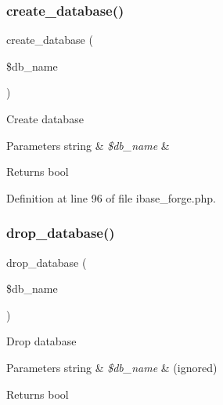 \mbox{\label{class_c_i___d_b__ibase__forge_a902a7267babceb2ce595706f217e00ad}} 
\subsubsection{\texorpdfstring{create\_database()}{create\_database()}}
{\footnotesize\ttfamily create\+\_\+database (\begin{DoxyParamCaption}\item[{}]{\$db\+\_\+name }\end{DoxyParamCaption})}

Create database


\begin{DoxyParams}[1]{Parameters}
string & {\em \$db\+\_\+name} & \\
\hline
\end{DoxyParams}
\begin{DoxyReturn}{Returns}
bool 
\end{DoxyReturn}


Definition at line 96 of file ibase\+\_\+forge.\+php.

\mbox{\label{class_c_i___d_b__ibase__forge_a9612987b2d4230de2638d15857e92e67}} 
\subsubsection{\texorpdfstring{drop\_database()}{drop\_database()}}
{\footnotesize\ttfamily drop\+\_\+database (\begin{DoxyParamCaption}\item[{}]{\$db\+\_\+name }\end{DoxyParamCaption})}

Drop database


\begin{DoxyParams}[1]{Parameters}
string & {\em \$db\+\_\+name} & (ignored) \\
\hline
\end{DoxyParams}
\begin{DoxyReturn}{Returns}
bool 
\end{DoxyReturn}


